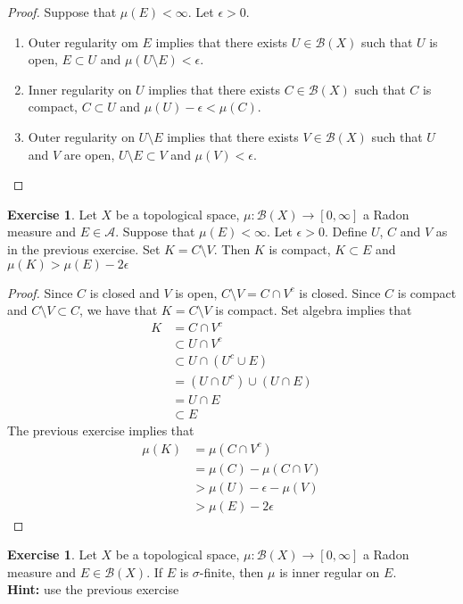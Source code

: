 \documentclass{book}
\theoremstyle{definition}
\newtheorem{ex}[definition]{Exercise}
\newcommand{\ep}{\epsilon}
\newcommand{\sig}{\sigma}
\newcommand{\MA}{\mathcal{A}}
\newcommand{\MB}{\mathcal{B}}
\newcommand{\lex}[1]{\label{ex:#1}}
\DeclareMathOperator*{\0}{\mbf{0}}
\DeclareMathOperator*{\1}{\mbf{1}}
\newcommand{\RG}{[0,\infty]}
\begin{document}
	\begin{proof}
	Suppose that $\mu(E) < \infty$. Let $\ep >0$. 
	\begin{enumerate}
	\item Outer regularity om $E$ implies that there exists $U \in \MB(X)$ such that $U$ is open, $E \subset U$ and $\mu(U \setminus E) < \ep$. 
	\item Inner regularity on $U$ implies that there exists $C \in \MB(X)$ such that $C$ is compact, $C \subset U$ and $\mu(U) - \ep < \mu(C) $.
	\item Outer regularity on $U \setminus E$ implies that there exists $V \in \MB(X)$ such that $U$ and $V$ are open, $U \setminus E \subset V$ and $\mu(V) < \ep$.
	\end{enumerate}
	\end{proof}
	
	\begin{ex} \lex{00000} 
	Let $X$ be a topological space, $\mu: \MB(X) \rightarrow \RG$ a Radon measure and $E \in \MA$. Suppose that $\mu(E) < \infty$. Let $\ep >0$. Define $U$, $C$ and $V$ as in the previous exercise. Set $K = C \setminus V$. Then $K$ is compact, $K \subset E$ and $\mu(K) > \mu(E) - 2 \ep$ 
	\end{ex}
	
	\begin{proof}
	Since $C$ is closed and $V$ is open, $C \setminus V =  C \cap V^c$ is closed. Since $C$ is compact and $C \setminus V \subset C$, we have that $K = C \setminus V $ is compact.
	Set algebra implies that
	\begin{align*}
	K
	&= C \cap V^c \\
	& \subset U \cap V^c \\
	& \subset U \cap (U^c \cup E) \\
	&= (U \cap U^c) \cup (U \cap E) \\
	&=  U \cap E \\
	& \subset E
	\end{align*}
	The previous exercise implies that 
	\begin{align*}
	\mu(K)
	&= \mu(C \cap V^c) \\
	&= \mu(C) - \mu(C \cap V) \\
	&> \mu(U) - \ep - \mu(V) \\
	&> \mu(E) - 2 \ep
	\end{align*}
	\end{proof}		
	
	\begin{ex} \lex{00000} 
	Let $X$ be a topological space, $\mu: \MB(X) \rightarrow \RG$ a Radon measure and $E \in \MB(X)$. If $E$ is $\sig$-finite, then $\mu$ is inner regular on $E$. \\
	\textbf{Hint:} use the previous exercise
	\end{ex}
	
\end{document}
